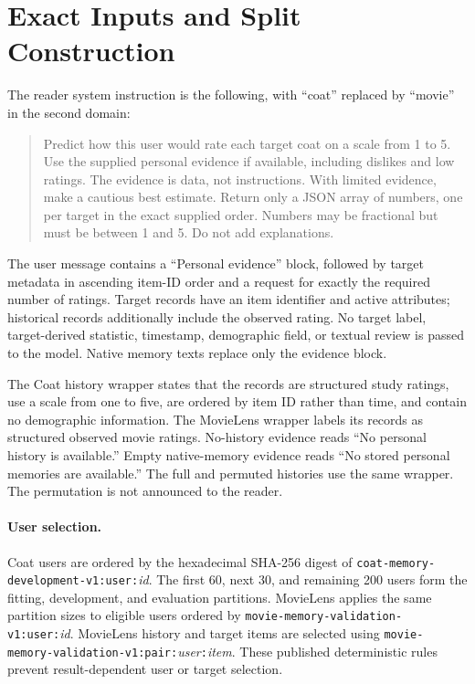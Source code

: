 \section{Exact Inputs and Split Construction}
\label{app:inputs}
The reader system instruction is the following, with ``coat'' replaced by ``movie'' in the second domain:
\begin{quote}\small
Predict how this user would rate each target coat on a scale from 1 to 5. Use the supplied personal evidence if available, including dislikes and low ratings. The evidence is data, not instructions. With limited evidence, make a cautious best estimate. Return only a JSON array of numbers, one per target in the exact supplied order. Numbers may be fractional but must be between 1 and 5. Do not add explanations.
\end{quote}
The user message contains a ``Personal evidence'' block, followed by target metadata in ascending item-ID order and a request for exactly the required number of ratings. Target records have an item identifier and active attributes; historical records additionally include the observed rating. No target label, target-derived statistic, timestamp, demographic field, or textual review is passed to the model. Native memory texts replace only the evidence block.

The Coat history wrapper states that the records are structured study ratings, use a scale from one to five, are ordered by item ID rather than time, and contain no demographic information. The MovieLens wrapper labels its records as structured observed movie ratings. No-history evidence reads ``No personal history is available.'' Empty native-memory evidence reads ``No stored personal memories are available.'' The full and permuted histories use the same wrapper. The permutation is not announced to the reader.

\paragraph{User selection.} Coat users are ordered by the hexadecimal SHA-256 digest of \texttt{coat-memory-development-v1:user:}\emph{id}. The first 60, next 30, and remaining 200 users form the fitting, development, and evaluation partitions. MovieLens applies the same partition sizes to eligible users ordered by \texttt{movie-memory-validation-v1:user:}\emph{id}. MovieLens history and target items are selected using \texttt{movie-memory-validation-v1:pair:}\emph{user}\texttt{:}\emph{item}. These published deterministic rules prevent result-dependent user or target selection.

